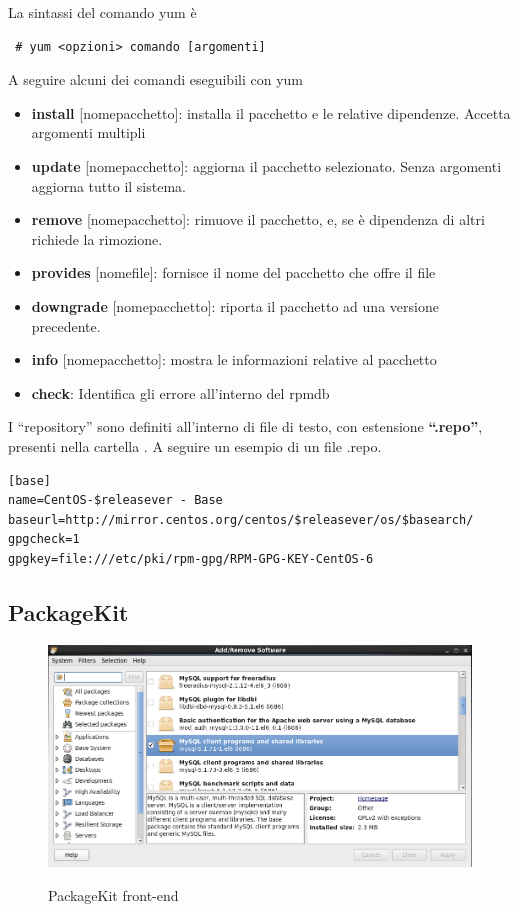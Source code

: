 La sintassi del comando yum è 
\begin{verbatim}
 # yum <opzioni> comando [argomenti]
\end{verbatim}

A seguire alcuni dei comandi eseguibili con yum

\begin{itemize}
 \item \textbf{install} [nomepacchetto]: installa il pacchetto e le relative dipendenze. Accetta argomenti multipli
 \item \textbf{update} [nomepacchetto]: aggiorna il pacchetto selezionato. Senza argomenti aggiorna tutto il sistema.
 \item \textbf{remove} [nomepacchetto]: rimuove il pacchetto, e, se è dipendenza di altri richiede la rimozione.
 \item \textbf{provides} [nomefile]: fornisce il nome del pacchetto che offre il file
 \item \textbf{downgrade} [nomepacchetto]: riporta il pacchetto ad una versione precedente.
 \item \textbf{info} [nomepacchetto]: mostra le informazioni relative al pacchetto
 \item \textbf{check}: Identifica gli errore all'interno del rpmdb
\end{itemize}


I ``repository'' sono definiti all'interno di file di testo, con estensione \textbf{``.repo''}, presenti nella cartella .
A seguire un esempio di un file .repo. 

\begin{verbatim}
[base]
name=CentOS-$releasever - Base
baseurl=http://mirror.centos.org/centos/$releasever/os/$basearch/
gpgcheck=1
gpgkey=file:///etc/pki/rpm-gpg/RPM-GPG-KEY-CentOS-6
\end{verbatim}


\subsection{PackageKit}

\begin{figure}[!ht]
  \centering
  \includegraphics[scale=0.4]{Immagini/packagekit1.png}
  \label{fig:PackageKit}
  \caption{PackageKit front-end}
\end{figure}


